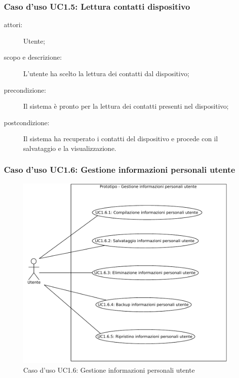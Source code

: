 \subsubsection{Caso d'uso UC1.5: Lettura contatti dispositivo}
\begin{description}
\item[attori:] Utente;
\item[scopo e descrizione:] L'utente ha scelto la lettura dei contatti dal dispositivo;
\item[precondizione:] Il sistema è pronto per la lettura dei contatti presenti nel dispositivo;
\item[postcondizione:] Il sistema ha recuperato i contatti del dispositivo e procede con il salvataggio e la visualizzazione.
\end{description}

\subsubsection{Caso d'uso UC1.6: Gestione informazioni personali utente}
\begin{figure}[htb]
\centering
\includegraphics[scale=0.6]{gfx/useCase/UC1-6_Gestione_informazioni_personali_utente.pdf}
\caption{Caso d'uso UC1.6: Gestione informazioni personali utente}
\label{fig:UC1.6}
\end{figure}

